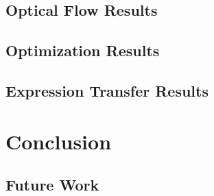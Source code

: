\documentclass[11pt,a4paper]{report}
\begin{document}
\section{Optical Flow Results}
\section{Optimization Results}
\section{Expression Transfer Results}

\chapter{Conclusion}
\section{Future Work}



\end{document}

